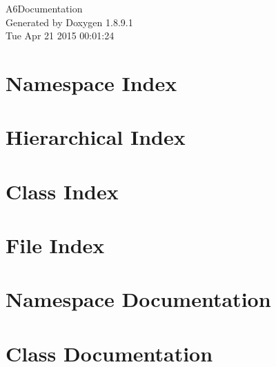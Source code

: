 \documentclass[twoside]{book}
\newcommand{\+}{\discretionary{\mbox{\scriptsize$\hookleftarrow$}}{}{}}
\newcommand{\clearemptydoublepage}{%
  \newpage{\pagestyle{empty}\cleardoublepage}%
}
\begin{document}
\hypersetup{pageanchor=false,
             bookmarks=true,
             bookmarksnumbered=true,
             pdfencoding=unicode
            }
\begin{titlepage}
\vspace*{7cm}
\begin{center}%
{\Large A6\+Documentation }\\
\vspace*{1cm}
{\large Generated by Doxygen 1.8.9.1}\\
\vspace*{0.5cm}
{\small Tue Apr 21 2015 00:01:24}\\
\end{center}
\end{titlepage}
\clearemptydoublepage
\tableofcontents
\clearemptydoublepage
{}
\hypersetup{pageanchor=true}

\chapter{Namespace Index}

\chapter{Hierarchical Index}

\chapter{Class Index}

\chapter{File Index}

\chapter{Namespace Documentation}






\chapter{Class Documentation}






















\end{document}
